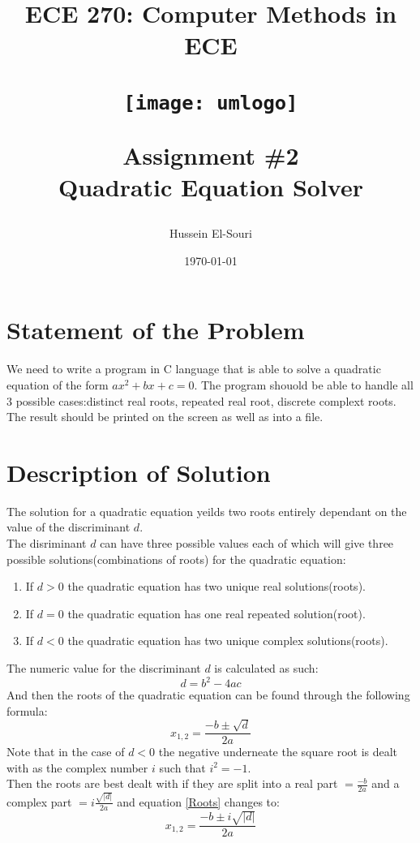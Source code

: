 \documentclass[letterpaper, 24pt, final, onecolumn, titlepage] {article}
\title{ECE 270: Computer Methods in ECE \\
	\vspace{1.5cm}
   		\begin{center}\texttt{[image: umlogo]} \end{center}
	\vspace{1.5cm}
	\textbf{Assignment \#2} \\
	Quadratic Equation Solver}
\author{Hussein El-Souri}
\date{\today}
\begin{document}
\maketitle

\doublespacing

\section{Statement of the Problem}
We need to write a program in C language that is able to solve a quadratic equation of the form $ax^2+bx+c = 0$. The program shouold be able to handle all 3 possible cases:distinct real roots, repeated real root, discrete complext roots. The result should be printed on the screen as well as into a file.\\

\pagebreak

\section{Description of Solution}
The solution for a quadratic equation yeilds two roots entirely dependant on the value of the discriminant $d$.\\
The disriminant $d$ can have three possible values each of which will give three possible solutions(combinations of roots) for the quadratic equation:
\begin{enumerate}
\item If $d>0$ the quadratic equation has two unique real solutions(roots).
\item If $d=0$ the quadratic equation has one real repeated solution(root).
\item If $d<0$ the quadratic equation has two unique complex solutions(roots).
\end{enumerate}
The numeric value for the discriminant $d$ is calculated as such:
\begin{equation}\label{discriminant}
d = b^2 -4ac
\end{equation}
And then the roots of the quadratic equation can be found through the following formula:
\begin{equation}  \label{Roots}
x_{1,2} = \frac{-b \pm \sqrt{d}}{2a}
\end{equation}
Note that in the case of $d<0$ the negative underneate the square root is dealt with as the complex number $i$ such that $i^2 = -1$.\\Then the roots are best dealt with if they are split into a real part $= \frac{-b}{2a}$ and a complex part $= i\frac{\sqrt{|d|}}{2a}$ and equation \ref{Roots} changes to:
\begin{equation} \label{ComplexRoots}
x_{1,2} = \frac{-b \pm i\sqrt{|d|}}{2a}
\end{equation}
\end{document}
